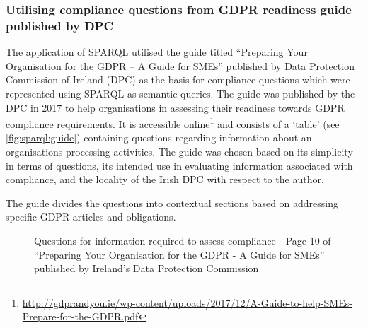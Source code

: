 \subsubsection{Utilising compliance questions from GDPR readiness guide published by DPC}
The application of SPARQL utilised the guide titled ``Preparing Your Organisation for the GDPR – A Guide for SMEs'' published by Data Protection Commission of Ireland (DPC) as the basis for compliance questions which were represented using SPARQL as semantic queries.
The guide was published by the DPC in 2017 to help organisations in assessing their readiness towards GDPR compliance requirements.
It is accessible online\footnote{\url{http://gdprandyou.ie/wp-content/uploads/2017/12/A-Guide-to-help-SMEs-Prepare-for-the-GDPR.pdf}} and consists of a `table' (see  \autoref{fig:sparql:guide}) containing questions regarding information about an organisations processing activities.
The guide was chosen based on its simplicity in terms of questions, its intended use in evaluating information associated with compliance, and the locality of the Irish DPC with respect to the author. 

The guide divides the questions into contextual sections based on addressing specific GDPR articles and obligations.
\begin{figure}[htbp]
\centering
{}
\caption{Questions for information required to assess compliance - Page 10 of ``Preparing Your Organisation for the GDPR - A Guide for SMEs'' published by Ireland's Data Protection Commission}
\label{fig:sparql:guide}
\end{figure}

